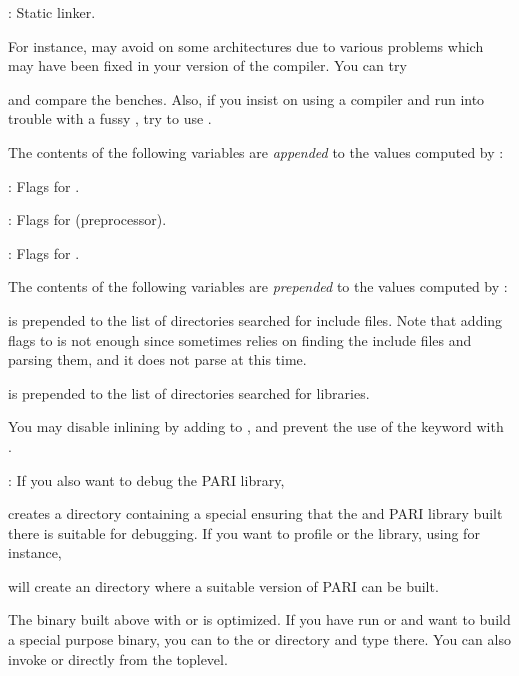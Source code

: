 : Static linker.

\noindent For instance,  may avoid  on some
architectures due to various problems which may have been fixed in your
version of the compiler. You can try


\noindent and compare the benches. Also, if you insist on using a 
compiler and run into trouble with a fussy , try to use
.


\noindent The contents of the following variables are \emph{appended} to the
values computed by :

: Flags for .

: Flags for  (preprocessor).

: Flags for .

\noindent The contents of the following variables are \emph{prepended} to
the values computed by :

 is prepended to the list of directories
searched for include files. Note that adding  flags to
 is not enough since  sometimes
relies on finding the include files and parsing them, and it does not
parse  at this time.

 is prepended to the list of directories
searched for libraries.

\noindent You may disable inlining by adding  to
, and prevent the use of the  keyword with
.

: If you also want to debug the PARI library,


\noindent creates a directory  containing a special
 ensuring that the  and PARI library built there is
suitable for debugging. If you want to
profile  or the library, using  for instance,


\noindent will create an  directory where a suitable version
of PARI can be built.

The  binary built above with  or  is
optimized. If you have run  or  and want to build
a special purpose binary, you can  to the  or 
directory and type  there. You can also invoke 
or  directly from the toplevel.

